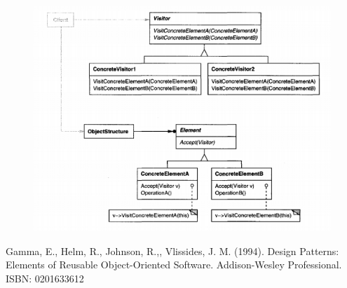 \documentclass{article}
\begin{document}
\begin{figure}[h]
    \centering
    \includegraphics[width=14cm]{diagrams/pattern-23-visitor.png}
\end{figure}

\begin{thebibliography}{}
\bibitem{}
Gamma, E., Helm, R., Johnson, R.,, Vlissides, J. M. (1994). Design Patterns: Elements of Reusable Object-Oriented Software. Addison-Wesley Professional. ISBN: 0201633612

\end{thebibliography}
\end{document}
